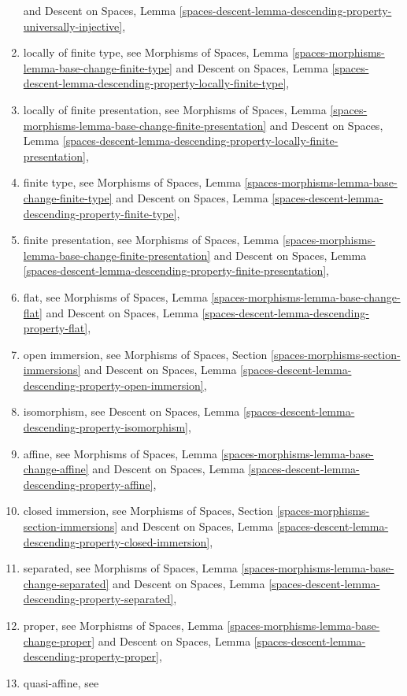 \begin{enumerate}
and
Descent on Spaces,
Lemma \ref{spaces-descent-lemma-descending-property-universally-injective},
\item locally of finite type, see
Morphisms of Spaces,
Lemma \ref{spaces-morphisms-lemma-base-change-finite-type}
and
Descent on Spaces,
Lemma \ref{spaces-descent-lemma-descending-property-locally-finite-type},
\item locally of finite presentation, see
Morphisms of Spaces,
Lemma \ref{spaces-morphisms-lemma-base-change-finite-presentation}
and
Descent on Spaces, Lemma
\ref{spaces-descent-lemma-descending-property-locally-finite-presentation},
\item finite type, see
Morphisms of Spaces,
Lemma \ref{spaces-morphisms-lemma-base-change-finite-type}
and
Descent on Spaces,
Lemma \ref{spaces-descent-lemma-descending-property-finite-type},
\item finite presentation, see
Morphisms of Spaces,
Lemma \ref{spaces-morphisms-lemma-base-change-finite-presentation}
and
Descent on Spaces, Lemma
\ref{spaces-descent-lemma-descending-property-finite-presentation},
\item flat, see
Morphisms of Spaces,
Lemma \ref{spaces-morphisms-lemma-base-change-flat}
and
Descent on Spaces,
Lemma \ref{spaces-descent-lemma-descending-property-flat},
\item open immersion, see
Morphisms of Spaces,
Section \ref{spaces-morphisms-section-immersions}
and
Descent on Spaces,
Lemma \ref{spaces-descent-lemma-descending-property-open-immersion},
\item isomorphism, see
Descent on Spaces,
Lemma \ref{spaces-descent-lemma-descending-property-isomorphism},
\item affine, see
Morphisms of Spaces,
Lemma \ref{spaces-morphisms-lemma-base-change-affine}
and
Descent on Spaces,
Lemma \ref{spaces-descent-lemma-descending-property-affine},
\item closed immersion, see
Morphisms of Spaces, Section \ref{spaces-morphisms-section-immersions}
and
Descent on Spaces,
Lemma \ref{spaces-descent-lemma-descending-property-closed-immersion},
\item separated, see
Morphisms of Spaces,
Lemma \ref{spaces-morphisms-lemma-base-change-separated}
and
Descent on Spaces,
Lemma \ref{spaces-descent-lemma-descending-property-separated},
\item proper, see
Morphisms of Spaces,
Lemma \ref{spaces-morphisms-lemma-base-change-proper}
and
Descent on Spaces,
Lemma \ref{spaces-descent-lemma-descending-property-proper},
\item quasi-affine, see

\end{enumerate}
